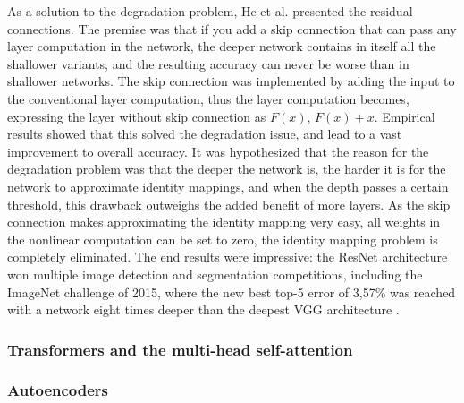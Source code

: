 \documentclass{article}
\begin{document}
As a solution to the degradation problem, He et al. \cite{resnet} presented the residual connections.
The premise was that if you add a skip connection that can pass any layer computation in the network, 
the deeper network contains in itself all the shallower variants, and the resulting accuracy can never 
be worse than in shallower networks. The skip connection was implemented by adding the input to the conventional 
layer computation, thus the layer computation becomes, expressing the layer without skip connection as $F(x)$, 
$F(x) + x$.
Empirical results showed that this solved the degradation issue, and lead to a 
vast improvement to overall accuracy. It was hypothesized that the reason for the degradation problem 
was that the deeper the network is, the harder it is for the network to approximate identity mappings, and when 
the depth passes a certain threshold, this drawback outweighs the added benefit of more layers. As the skip 
connection makes approximating the identity mapping very easy, all weights in the nonlinear computation can 
be set to zero, the identity mapping problem is completely eliminated. The end results were impressive: 
the ResNet architecture won multiple image detection and segmentation competitions, including the ImageNet challenge 
of 2015, where the new best top-5 error of 3,57\% was reached with a network eight times deeper than the deepest VGG architecture \cite{resnet}.

\subsubsection{Transformers and the multi-head self-attention}

\subsubsection{Autoencoders}
\end{document}
